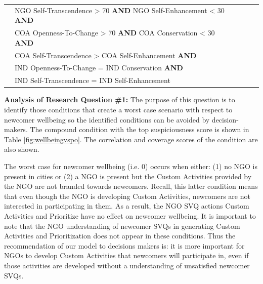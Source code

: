 \documentclass{scspaperproc}
\theoremstyle{scsthe}
\begin{document}
\begin{table}[ht]
\begin{center}
{\begin{tabular}{|l l l l l |}
                                                                      & NGO Self-Transcendence > 70 \textbf{AND} NGO Self-Enhancement < 30 \textbf{AND}& & & \\ 
                                                                      & COA Openness-To-Change > 70 \textbf{AND} COA Conservation < 30 \textbf{AND} & & & \\         
                                                                      & COA Self-Transcendence > COA Self-Enhancement \textbf{AND} & & & \\ 
                                                                      & IND Openness-To-Change = IND Conservation \textbf{AND} & & & \\         
                                                                      & IND Self-Transcendence =  IND Self-Enhancement& & & \\ 
\hline
\end{tabular}}
\end{center}
\end{table}
 
{\bf Analysis of Research Question \#1:} The purpose of this question is to identify those conditions that create a worst case scenario with respect to newcomer wellbeing so the identified conditions can be avoided by decision-makers. The compound condition with the top suspiciousness score is shown in Table \ref{fig:wellbeingvspo}. The correlation and coverage scores of the condition are also shown. 

The worst case for newcomer wellbeing (i.e. 0) occurs when either: (1) no NGO is present in cities or (2) a NGO is present but the Custom Activities provided by the NGO are not branded towards newcomers. Recall, this latter condition means that even though the NGO is developing Custom Activities, newcomers are not interested in participating in them. As a result, the NGO SVQ actions Custom Activities and Prioritize have no effect on newcomer wellbeing. It is important to note that the NGO understanding of newcomer SVQs in generating Custom Activities and Prioritization does not appear in these conditions. Thus the recommendation of our model to decisions makers is: it is more important for NGOs to develop Custom Activities that newcomers will participate in, even if those activities are developed without a understanding of unsatisfied newcomer SVQs. 
\end{document}
